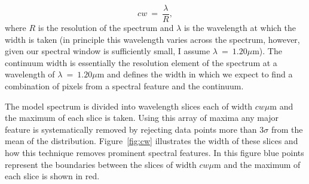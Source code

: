 \documentclass[12pt]{article}
\begin{document}
\begin{equation}
    cw~=~\frac{\lambda}{R}, %
\end{equation}
\noindent where $R$ is the resolution of the spectrum and
$\lambda$ is the wavelength at which the width is taken
(in principle this wavelength varies across the spectrum, however, given our spectral window is sufficiently small, I assume $\lambda~=~1.20\mu$m).
The continuum width is essentially the resolution element of the spectrum at a wavelength of
$\lambda~=~1.20\mu$m and defines the width in which we expect to find a combination of pixels from a spectral feature and the continuum.


The model spectrum is divided into wavelength slices each of width $cw\mu$m and the maximum of each slice is taken.
Using this array of maxima any major feature is systematically removed by rejecting data points more than 3$\sigma$ from the mean of the distribution.
Figure~\ref{fig:cw} illustrates the width of these slices and how this technique  removes prominent spectral features.
In this figure blue points represent the boundaries between the slices of width $cw\mu$m and the maximum of each slice is shown in red.
\end{document}
